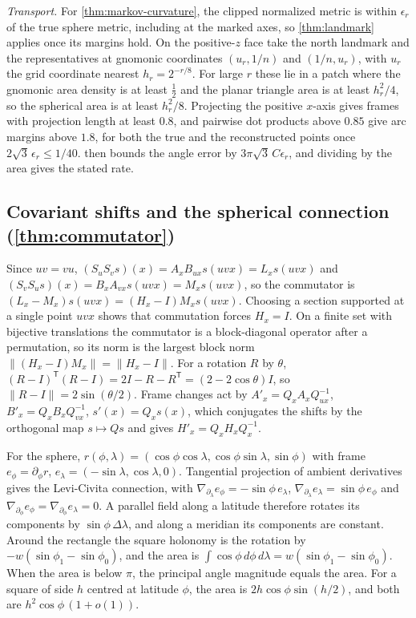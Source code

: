 \documentclass[11pt]{article}
\begin{document}
\emph{Transport.}
For \cref{thm:markov-curvature}, the clipped normalized metric is within $\epsilon_r$ of the true sphere metric, including at the marked axes, so \cref{thm:landmark} applies once its margins hold.
On the positive-$z$ face take the north landmark and the representatives at gnomonic coordinates $(u_r,1/n)$ and $(1/n,u_r)$, with $u_r$ the grid coordinate nearest $h_r=2^{-r/8}$.
For large $r$ these lie in a patch where the gnomonic area density is at least $\tfrac12$ and the planar triangle area is at least $h_r^2/4$, so the spherical area is at least $h_r^2/8$.
Projecting the positive $x$-axis gives frames with projection length at least $0.8$, and pairwise dot products above $0.85$ give arc margins above $1.8$, for both the true and the reconstructed points once $2\sqrt3\,\epsilon_r\le1/40$.
 then bounds the angle error by $3\pi\sqrt3\,C\epsilon_r$, and dividing by the area gives the stated rate.

\subsection{Covariant shifts and the spherical connection (\texorpdfstring{\cref{thm:commutator}}{Theorem 7.1})}
\label{app:connection-proof}

Since $uv=vu$, $(S_uS_vs)(x)=A_xB_{ux}s(uvx)=L_xs(uvx)$ and $(S_vS_us)(x)=B_xA_{vx}s(uvx)=M_xs(uvx)$, so the commutator is $(L_x-M_x)s(uvx)=(H_x-I)M_xs(uvx)$.
Choosing a section supported at a single point $uvx$ shows that commutation forces $H_x=I$.
On a finite set with bijective translations the commutator is a block-diagonal operator after a permutation, so its norm is the largest block norm $\|(H_x-I)M_x\|=\|H_x-I\|$.
For a rotation $R$ by $\theta$, $(R-I)^{\mathsf T}(R-I)=2I-R-R^{\mathsf T}=(2-2\cos\theta)I$, so $\|R-I\|=2\sin(\theta/2)$.
Frame changes act by $A'_x=Q_xA_xQ_{ux}^{-1}$, $B'_x=Q_xB_xQ_{vx}^{-1}$, $s'(x)=Q_xs(x)$, which conjugates the shifts by the orthogonal map $s\mapsto Q s$ and gives $H'_x=Q_xH_xQ_x^{-1}$.

For the sphere, $r(\phi,\lambda)=(\cos\phi\cos\lambda,\cos\phi\sin\lambda,\sin\phi)$ with frame $e_\phi=\partial_\phi r$, $e_\lambda=(-\sin\lambda,\cos\lambda,0)$.
Tangential projection of ambient derivatives gives the Levi-Civita connection, with $\nabla_{\partial_\lambda}e_\phi=-\sin\phi\,e_\lambda$, $\nabla_{\partial_\lambda}e_\lambda=\sin\phi\,e_\phi$ and $\nabla_{\partial_\phi}e_\phi=\nabla_{\partial_\phi}e_\lambda=0$.
A parallel field along a latitude therefore rotates its components by $\sin\phi\,\Delta\lambda$, and along a meridian its components are constant.
Around the rectangle the square holonomy is the rotation by $-w(\sin\phi_1-\sin\phi_0)$, and the area is $\int\cos\phi\,d\phi\,d\lambda=w(\sin\phi_1-\sin\phi_0)$.
When the area is below $\pi$, the principal angle magnitude equals the area. For a square of side $h$ centred at latitude $\phi$, the area is $2h\cos\phi\sin(h/2)$, and both are $h^2\cos\phi\,(1+o(1))$.
\end{document}
